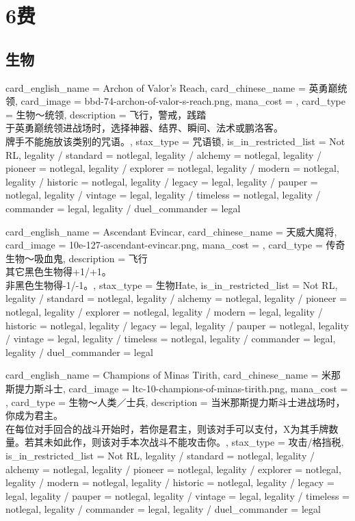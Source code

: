 \documentclass[lang = cn, color = black, 10pt]{AllThatStax}
\begin{document}
\chapter{6费}

\section{生物}

\card
{
	card_english_name = {Archon of Valor's Reach},
	card_chinese_name = {英勇巅统领},
	card_image = bbd-74-archon-of-valor-s-reach.png,
	mana_cost = ,
	card_type = 生物～统领,
	description = {飞行，警戒，践踏\\
于英勇巅统领进战场时，选择神器、结界、瞬间、法术或鹏洛客。\\
牌手不能施放该类别的咒语。},
	stax_type = 咒语锁,
	is_in_restricted_list = Not RL,
	legality / standard = notlegal,
	legality / alchemy = notlegal,
	legality / pioneer = notlegal,
	legality / explorer = notlegal,
	legality / modern = notlegal,
	legality / historic = notlegal,
	legality / legacy = legal,
	legality / pauper = notlegal,
	legality / vintage = legal,
	legality / timeless = notlegal,
	legality / commander = legal,
	legality / duel_commander = legal
}

\card
{
	card_english_name = {Ascendant Evincar},
	card_chinese_name = {天威大魔将},
	card_image = 10e-127-ascendant-evincar.png,
	mana_cost = ,
	card_type = 传奇生物～吸血鬼,
	description = {飞行\\
其它黑色生物得+1/+1。\\
非黑色生物得-1/-1。},
	stax_type = 生物Hate,
	is_in_restricted_list = Not RL,
	legality / standard = notlegal,
	legality / alchemy = notlegal,
	legality / pioneer = notlegal,
	legality / explorer = notlegal,
	legality / modern = legal,
	legality / historic = notlegal,
	legality / legacy = legal,
	legality / pauper = notlegal,
	legality / vintage = legal,
	legality / timeless = notlegal,
	legality / commander = legal,
	legality / duel_commander = legal
}

\card
{
	card_english_name = {Champions of Minas Tirith},
	card_chinese_name = {米那斯提力斯斗士},
	card_image = ltc-10-champions-of-minas-tirith.png,
	mana_cost = ,
	card_type = 生物～人类／士兵,
	description = {当米那斯提力斯斗士进战场时，你成为君主。\\
在每位对手回合的战斗开始时，若你是君主，则该对手可以支付，X为其手牌数量。若其未如此作，则该对手本次战斗不能攻击你。},
	stax_type = 攻击/格挡税,
	is_in_restricted_list = Not RL,
	legality / standard = notlegal,
	legality / alchemy = notlegal,
	legality / pioneer = notlegal,
	legality / explorer = notlegal,
	legality / modern = notlegal,
	legality / historic = notlegal,
	legality / legacy = legal,
	legality / pauper = notlegal,
	legality / vintage = legal,
	legality / timeless = notlegal,
	legality / commander = legal,
	legality / duel_commander = legal
}
\end{document}
